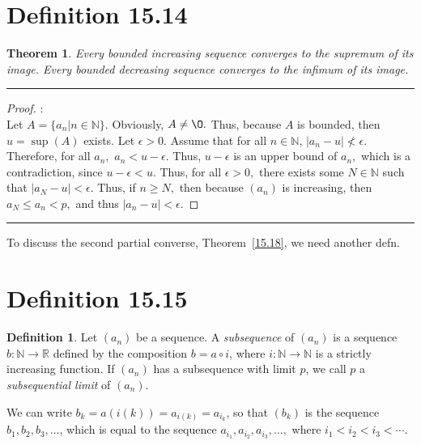 \documentclass[openany, amssymb, psamsfonts]{amsart}
\newcommand{\bbN}{\mathbb{N}}
\newcommand{\bbR}{\mathbb{R}}
\renewcommand{\emptyset}{\O}
\newtheorem{thm}{Theorem}[section]
\theoremstyle{definition}
\newtheorem{defn}{Definition}[section]
\numberwithin{equation}{section}
\begin{document}
\section*{Definition 15.14}
\begin{thm}
\label{15.14}
	\label{thm:increasing converges}
	Every bounded increasing sequence converges to the supremum of its image. Every bounded decreasing sequence converges to the infimum of its image.
\end{thm}
\vspace{4pt}     \hrule   \vspace{4pt}\begin{proof}:\\
Let $A = \{a_n | n \in \bbN\}$. Obviously, $A \neq \emptyset.$ Thus, because $A$ is bounded, then $u = \sup(A)$ exists. Let $\epsilon>0.$ Assume that for all $n\in \bbN$, $|a_n - u|\not < \epsilon.$ Therefore, for all $a_n,$ $a_n< u-\epsilon.$ Thus, $u-\epsilon$ is an upper bound of $a_n,$ which is a contradiction, since $u-\epsilon< u.$ Thus, for all $\epsilon>0,$ there exists some $N\in \bbN$ such that $|a_N - u|< \epsilon.$ Thus, if $n\geq N,$ then because $(a_n)$ is increasing, then $a_N \leq a_n< p,$ and thus $|a_n - u|< \epsilon.$
\end{proof}\vspace{4pt}     \hrule   \vspace{4pt}
To discuss the second partial converse, Theorem~\ref{15.18}, we need another defn.

\section*{Definition 15.15}
\begin{defn}
\label{15.15}
	Let $(a_n)$ be a sequence.  A \emph{subsequence} of $(a_n)$ is a sequence $b\colon \bbN \to \bbR$ defined by the composition $b = a \circ i$, where $i\colon \bbN \to \bbN$ is a strictly increasing function. If $(a_n)$ has a subsequence with limit $p$, we call $p$ a \emph{subsequential limit} of $(a_n)$.
\end{defn}

We can write $b_k = a(i(k)) = a_{i(k)} = a_{i_k}$, so that $(b_k)$ is the sequence $b_1, b_2, b_3, \dotsc$, which is equal to the sequence $a_{i_1}, a_{i_2}, a_{i_3}, \dotsc, $ where $i_1 < i_2 < i_3 < \dotsb$. 
\end{document}
